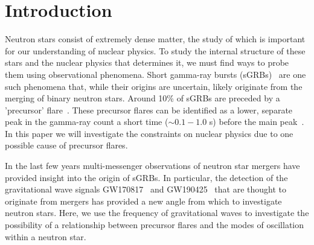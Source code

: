 \documentclass[fleqn,usenatbib]{mnras}
\begin{document}



 

\section{Introduction}
\hspace{\parindent}Neutron stars consist of extremely dense matter, the study of which is important for our understanding of nuclear physics. To study the internal structure of these stars and the nuclear physics that determines it, we must find ways to probe them using observational phenomena. Short gamma-ray bursts (sGRBs)~\cite{d2015short} are one such phenomena that, while their origins are uncertain, likely originate from the merging of binary neutron stars. Around 10\% of sGRBs are preceded by a 'precursor' flare~\cite{troja2010precursors}. These precursor flares can be identified as a lower, separate peak in the gamma-ray count a short time ($\sim 0.1-1.0$ s) before the main peak~\cite{zhong2019precursors}. In this paper we will investigate the constraints on nuclear physics due to one possible cause of precursor flares.

\hspace{\parindent}In the last few years multi-messenger observations of neutron star mergers have provided insight into the origin of sGRBs. In particular, the detection of the gravitational wave signals GW170817~\cite{abbott2017merger} and GW190425~\cite{abbott2020gw190425} that are thought to originate from mergers has provided a new angle from which to investigate neutron stars. Here, we use the frequency of gravitational waves to investigate the possibility of a relationship between precursor flares and the modes of oscillation within a neutron star.
\end{document}
